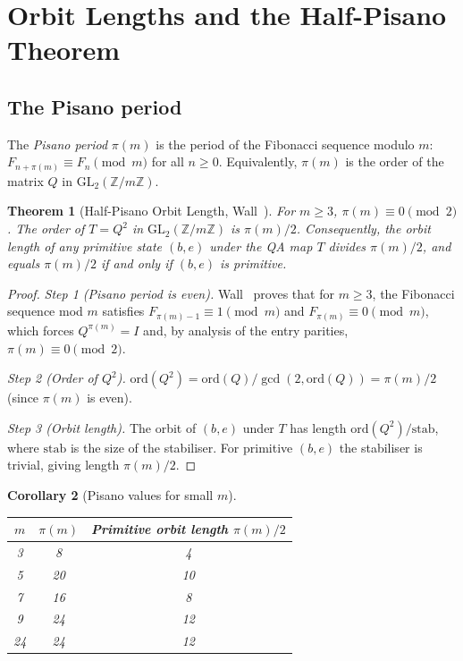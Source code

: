 \documentclass[11pt]{article}
\newtheorem{theorem}{Theorem}[section]
\newtheorem{corollary}[theorem]{Corollary}
\theoremstyle{definition}
\theoremstyle{remark}
\begin{document}
\section{Orbit Lengths and the Half-Pisano Theorem}
\label{sec:pisano}

\subsection{The Pisano period}

The \emph{Pisano period} $\pi(m)$ is the period of the Fibonacci sequence modulo
$m$: $F_{n+\pi(m)}\equiv F_n\pmod{m}$ for all $n\geq 0$.  Equivalently,
$\pi(m)$ is the order of the matrix $Q$ in $\mathrm{GL}_2(\mathbb{Z}/m\mathbb{Z})$.

\begin{theorem}[Half-Pisano Orbit Length, Wall~\cite{wall1960}]
\label{thm:half-pisano}
For $m\geq 3$, $\pi(m)\equiv 0\pmod{2}$.  The order of $T=Q^2$ in
$\mathrm{GL}_2(\mathbb{Z}/m\mathbb{Z})$ is $\pi(m)/2$.  Consequently,
the orbit length of any primitive state $(b,e)$ under the QA map $T$ divides
$\pi(m)/2$, and equals $\pi(m)/2$ if and only if $(b,e)$ is primitive.
\end{theorem}

\begin{proof}
\emph{Step 1 (Pisano period is even).}
Wall~\cite{wall1960} proves that for $m\geq 3$, the Fibonacci sequence
mod $m$ satisfies $F_{\pi(m)-1}\equiv 1\pmod{m}$ and
$F_{\pi(m)}\equiv 0\pmod{m}$, which forces $Q^{\pi(m)}=I$ and, by
analysis of the entry parities, $\pi(m)\equiv 0\pmod 2$.

\emph{Step 2 (Order of $Q^2$).}
$\mathrm{ord}(Q^2)=\mathrm{ord}(Q)/\gcd(2,\mathrm{ord}(Q))=\pi(m)/2$
(since $\pi(m)$ is even).

\emph{Step 3 (Orbit length).}
The orbit of $(b,e)$ under $T$ has length $\mathrm{ord}(Q^2)/\mathrm{stab}$,
where $\mathrm{stab}$ is the size of the stabiliser.  For primitive $(b,e)$
the stabiliser is trivial, giving length $\pi(m)/2$.
\end{proof}

\begin{corollary}[Pisano values for small $m$]
\label{cor:pisano}
\hfill
\begin{center}
\begin{tabular}{ccc}
\toprule
$m$ & $\pi(m)$ & Primitive orbit length $\pi(m)/2$ \\
\midrule
3  & 8  & 4 \\
5  & 20 & 10 \\
7  & 16 & 8 \\
9  & 24 & 12 \\
24 & 24 & 12 \\
\bottomrule
\end{tabular}
\end{center}
\end{corollary}
\end{document}
